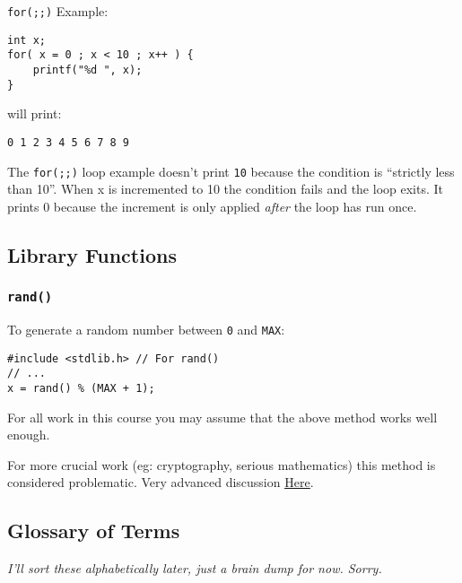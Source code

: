 \documentclass{lab}
\begin{document}
\begin{multicols}{2}
\texttt{for(;;)} Example:

\begin{lstlisting}[style=CStyle]
int x;
for( x = 0 ; x < 10 ; x++ ) {
	printf("%d ", x);
}
\end{lstlisting}

will print:

\texttt{0 1 2 3 4 5 6 7 8 9}

The \texttt{for(;;)} loop example doesn't print \texttt{10} because the condition is ``strictly less than 10''. When x is incremented to 10 the condition fails and the loop exits. It prints 0 because the increment is only applied \textit{after} the loop has run once.


\subsection{Library Functions}
\subsubsection{\texttt{rand()}}

To generate a random number between \texttt{0} and \texttt{MAX}:

\begin{lstlisting}[style=CStyle]
#include <stdlib.h> // For rand()
// ...
x = rand() % (MAX + 1);
\end{lstlisting}

For all work in this course you may assume that the above method works well enough.

For more crucial work (eg: cryptography, serious mathematics) this method is considered problematic. Very advanced discussion \underline{\href{http://www.azillionmonkeys.com/qed/random.html}{Here}}.

\subsection{Glossary of Terms}

\textit{I'll sort these alphabetically later, just a brain dump for now. Sorry.}


\end{multicols}
\end{document}
